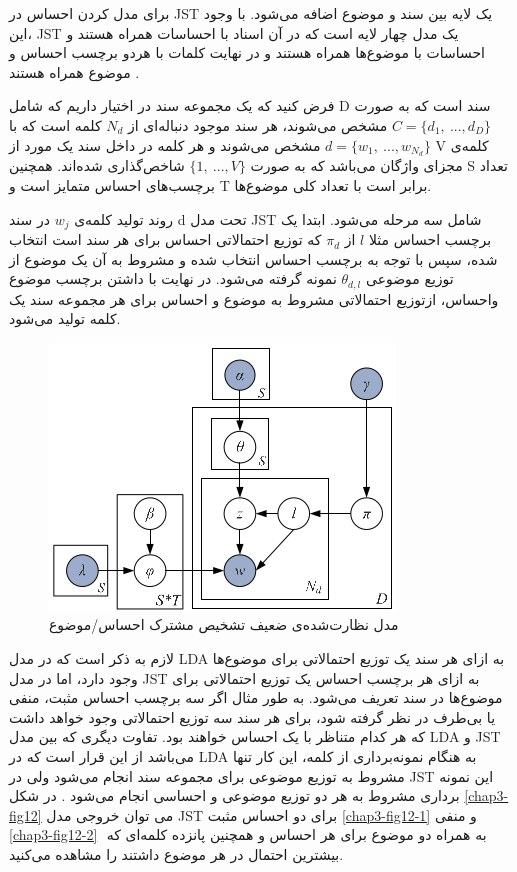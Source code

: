   برای مدل کردن احساس در 
 JST
 یک لایه بین سند و موضوع اضافه می‌شود. با وجود این، 
 JST
 یک مدل چهار لایه است که در آن اسناد با احساسات همراه هستند و احساسات با موضوع‌ها همراه هستند و در نهایت کلمات با هردو برچسب احساس و موضوع همراه هستند
 \cite{lin2012weakly}.
 
  فرض کنید که یک مجموعه سند در اختیار داریم که شامل
  D
   سند است که به صورت  
  $C = \{d_1,\ ...,d_D\}$
   مشخص می‌‌شوند، هر سند موجود دنباله‌ای از  
  $N_d$
   کلمه است که با  
   $d=\{w_1,\ ...,w_{N_d} \}$
    مشخص می‌‌شوند و هر کلمه در داخل سند یک مورد از 
    V
    کلمه‌ی مجزای واژگان می‌باشد که به صورت 
    $\{1,\ ...,V\}$
    شاخص‌گذاری شده‌اند. همچنین 
    S
    تعداد برچسب‌های احساس متمایز است و 
    T
    برابر است با تعداد کلی‌ موضوع‌ها.
    
     روند تولید کلمه‌ی  
   $w_j$
    در سند 
    d
    تحت مدل 
    JST
    شامل سه‌ مرحله می‌‌شود. ابتدا یک برچسب احساس مثلا  
    $l$
    از  
    $\pi_d$
    که توزیع احتمالاتی احساس برای هر سند است انتخاب شده، سپس با توجه به برچسب احساس انتخاب شده و مشروط به آن یک موضوع از توزیع موضوعی 
    $\theta_{d,l}$
     نمونه گرفته می‌شود. در نهایت با داشتن برچسب موضوع واحساس، ازتوزیع احتمالاتی مشروط به موضوع و احساس برای هر مجموعه سند یک کلمه تولید می‌شود. 
   	\begin{figure}[!h]
   		\centering
   		\includegraphics[scale=0.5]{chap3-img/JST}
   		\caption{مدل نظارت‌شده‌ی ضعیف تشخیص مشترک احساس/موضوع \cite{lin2012weakly}}
   		\label{chap3-fig8}
   	\end{figure}
    
     لازم به ذکر است که در مدل 
     LDA
به ازای هر سند یک توزیع احتمالاتی برای موضوع‌ها وجود دارد، اما در مدل 
     JST
     به ازای هر برچسب احساس یک توزیع احتمالاتی برای موضوع‌ها در سند تعریف می‌شود. به طور مثال اگر سه‌ برچسب احساس مثبت، منفی‌ یا بی‌طرف در نظر گرفته شود، برای هر سند سه‌ توزیع احتمالاتی وجود خواهد داشت که هر کدام متناظر با یک احساس خواهند بود. تفاوت دیگری که بین مدل
LDA
       و
JST
می‌باشد از این قرار است که در
LDA
  به هنگام نمونه‌برداری از کلمه، این کار تنها مشروط به توزیع موضوعی برای مجموعه سند انجام می‌‌شود ولی‌ در
JST
    این نمونه برداری مشروط به هر دو توزیع موضوعی و احساسی‌ انجام می‌‌شود
    \cite{lin2012weakly}.
    در شکل
    \ref{chap3-fig12}
    می‌ توان خروجی مدل
    JST
    برای دو احساس مثبت 
    \ref{chap3-fig12-1}
    و منفی
    \ref{chap3-fig12-2}
    ‌  به همراه دو موضوع برای هر احساس و همچنین پانزده کلمه‌ای که بیشترین احتمال در هر موضوع داشتند را مشاهده می‌‌کنید.
    

